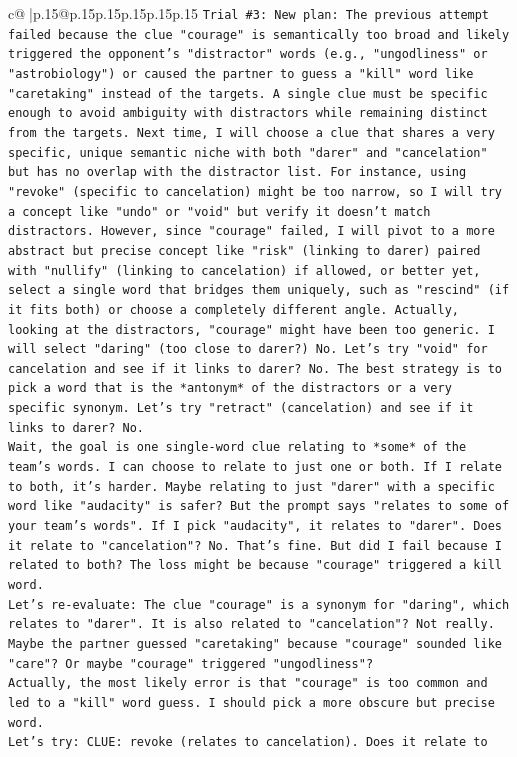 \documentclass{article}
\begin{document}
{\begin{supertabular}{c@{$\;$}|p{.15\linewidth}@{}p{.15\linewidth}p{.15\linewidth}p{.15\linewidth}p{.15\linewidth}p{.15\linewidth}}
{{{\texttt{Trial \#3: New plan: The previous attempt failed because the clue "courage" is semantically too broad and likely triggered the opponent's "distractor" words (e.g., "ungodliness" or "astrobiology") or caused the partner to guess a "kill" word like "caretaking" instead of the targets. A single clue must be specific enough to avoid ambiguity with distractors while remaining distinct from the targets. Next time, I will choose a clue that shares a very specific, unique semantic niche with both "darer" and "cancelation" but has no overlap with the distractor list. For instance, using "revoke" (specific to cancelation) might be too narrow, so I will try a concept like "undo" or "void" but verify it doesn't match distractors. However, since "courage" failed, I will pivot to a more abstract but precise concept like "risk" (linking to darer) paired with "nullify" (linking to cancelation) if allowed, or better yet, select a single word that bridges them uniquely, such as "rescind" (if it fits both) or choose a completely different angle. Actually, looking at the distractors, "courage" might have been too generic. I will select "daring" (too close to darer?) No. Let's try "void" for cancelation and see if it links to darer? No. The best strategy is to pick a word that is the *antonym* of the distractors or a very specific synonym. Let's try "retract" (cancelation) and see if it links to darer? No.} \\
\texttt{Wait, the goal is one single{-}word clue relating to *some* of the team's words. I can choose to relate to just one or both. If I relate to both, it's harder. Maybe relating to just "darer" with a specific word like "audacity" is safer? But the prompt says "relates to some of your team's words". If I pick "audacity", it relates to "darer". Does it relate to "cancelation"? No. That's fine. But did I fail because I related to both? The loss might be because "courage" triggered a kill word.} \\
\texttt{Let's re{-}evaluate: The clue "courage" is a synonym for "daring", which relates to "darer". It is also related to "cancelation"? Not really. Maybe the partner guessed "caretaking" because "courage" sounded like "care"? Or maybe "courage" triggered "ungodliness"?} \\
\texttt{Actually, the most likely error is that "courage" is too common and led to a "kill" word guess. I should pick a more obscure but precise word.} \\
\texttt{Let's try: CLUE: revoke (relates to cancelation). Does it relate to} \\
}}}
\end{supertabular}}
\end{document}
